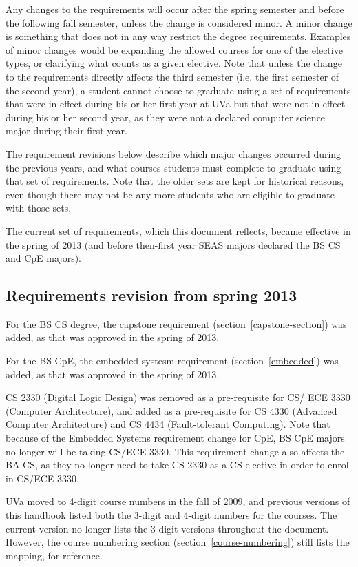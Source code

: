 \documentclass[10pt,letter]{book}
\begin{document}
Any changes to the requirements will occur after the spring semester
and before the following fall semester, unless the change is
considered minor. A minor change is something that does not in any way
restrict the degree requirements. Examples of minor changes would be
expanding the allowed courses for one of the elective types, or
clarifying what counts as a given elective. Note that unless the
change to the requirements directly affects the third semester
(i.e. the first semester of the second year), a student cannot choose
to graduate using a set of requirements that were in effect during his
or her first year at UVa but that were not in effect during his or her
second year, as they were not a declared computer science major during
their first year.

The requirement revisions below describe which major changes occurred
during the previous years, and what courses students must complete to
graduate using that set of requirements. Note that the older sets are
kept for historical reasons, even though there may not be any more
students who are eligible to graduate with those sets.

The current set of requirements, which this document reflects, became
effective in the spring of 2013 (and before then-first year SEAS
majors declared the BS CS and CpE majors).

\subsection{Requirements revision from spring 2013}

For the BS CS degree, the capstone requirement
(section~\ref{capstone-section}) was added, as that was approved in
the spring of 2013.

For the BS CpE, the embedded systesm requirement
(section~\ref{embedded}) was added, as that was approved in the spring
of 2013.

CS 2330 (Digital Logic Design) was removed as a pre-requisite for
CS/ ECE 3330 (Computer Architecture), and added as a pre-requisite for
CS 4330 (Advanced Computer Architecture) and CS 4434 (Fault-tolerant
Computing).  Note that because of the Embedded Systems requirement
change for CpE, BS CpE majors no longer will be taking CS/ECE 3330.
This requirement change also affects the BA CS, as they no longer need
to take CS 2330 as a CS elective in order to enroll in CS/ECE 3330.

UVa moved to 4-digit course numbers in the fall of 2009, and previous
versions of this handbook listed both the 3-digit and 4-digit numbers
for the courses.  The current version no longer lists the 3-digit
versions throughout the document.  However, the course numbering
section (section~\ref{course-numbering}) still lists the mapping, for
reference.
\end{document}
